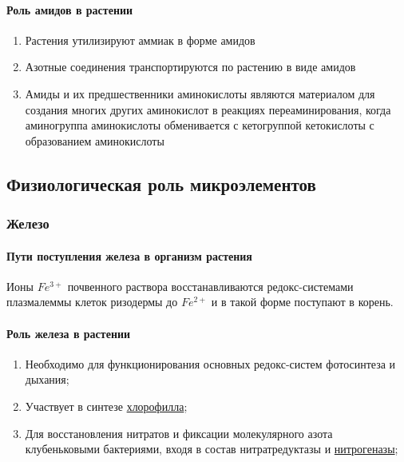 \paragraph*{Роль амидов в растении}

\begin{enumerate}
	\item Растения утилизируют аммиак в форме амидов
	\item Азотные соединения транспортируются по растению в виде амидов
	\item Амиды и их предшественники аминокислоты являются материалом для создания многих других аминокислот в реакциях переаминирования, когда аминогруппа аминокислоты обменивается с кетогруппой кетокислоты с образованием аминокислоты
\end{enumerate}

\subsection*{Физиологическая роль микроэлементов}

\subsubsection*{Железо}

\paragraph*{Пути поступления железа в организм растения} Ионы $Fe^{3+}$ почвенного раствора восстанавливаются редокс-системами плазмалеммы клеток ризодермы до $Fe^{2+}$ и в такой форме поступают в корень. 

\paragraph*{Роль железа в растении}

\begin{enumerate}
\item Необходимо для функционирования основных редокс-систем фотосинтеза и дыхания;
\item Участвует в синтезе \hyperlink{sect_hlorophilus}{хлорофилла};
\item Для восстановления нитратов и фиксации молекулярного азота клубеньковыми бактериями, входя в состав нитратредуктазы и \hyperlink{nitrogenaza}{нитрогеназы};
\end{enumerate}


